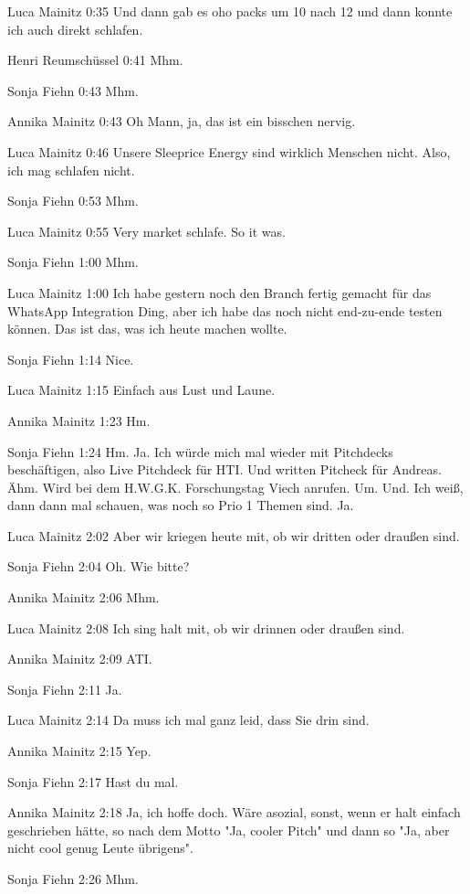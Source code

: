 Luca Mainitz   0:35
Und dann gab es oho packs um 10 nach 12 und dann konnte ich auch direkt schlafen.

Henri Reumschüssel   0:41
Mhm.

Sonja Fiehn   0:43
Mhm.

Annika Mainitz   0:43
Oh Mann, ja, das ist ein bisschen nervig.

Luca Mainitz   0:46
Unsere Sleeprice Energy sind wirklich Menschen nicht.
Also, ich mag schlafen nicht.

Sonja Fiehn   0:53
Mhm.

Luca Mainitz   0:55
Very market schlafe. So it was.

Sonja Fiehn   1:00
Mhm.

Luca Mainitz   1:00
Ich habe gestern noch den Branch fertig gemacht für das WhatsApp Integration Ding, aber ich habe das noch nicht end-zu-ende testen können.
Das ist das, was ich heute machen wollte.

Sonja Fiehn   1:14
Nice.

Luca Mainitz   1:15
Einfach aus Lust und Laune.

Annika Mainitz   1:23
Hm.

Sonja Fiehn   1:24
Hm.
Ja.
Ich würde mich mal wieder mit Pitchdecks beschäftigen, also Live Pitchdeck für HTI.
Und written Pitcheck für Andreas.
Ähm.
Wird bei dem H.W.G.K. Forschungstag Viech anrufen.
Um.
Und.
Ich weiß, dann dann mal schauen, was noch so Prio 1 Themen sind.
Ja.

Luca Mainitz   2:02
Aber wir kriegen heute mit, ob wir dritten oder draußen sind.

Sonja Fiehn   2:04
Oh.
Wie bitte?

Annika Mainitz   2:06
Mhm.

Luca Mainitz   2:08
Ich sing halt mit, ob wir drinnen oder draußen sind.

Annika Mainitz   2:09
ATI.

Sonja Fiehn   2:11
Ja.

Luca Mainitz   2:14
Da muss ich mal ganz leid, dass Sie drin sind.

Annika Mainitz   2:15
Yep.

Sonja Fiehn   2:17
Hast du mal.

Annika Mainitz   2:18
Ja, ich hoffe doch. Wäre asozial, sonst, wenn er halt einfach geschrieben hätte, so nach dem Motto "Ja, cooler Pitch" und dann so "Ja, aber nicht cool genug Leute übrigens".

Sonja Fiehn   2:26
Mhm.

